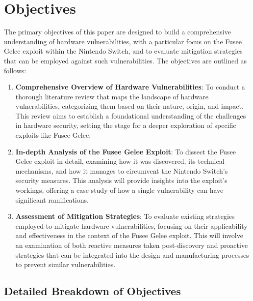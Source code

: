 \hypertarget{objectives}{%
\section{Objectives}\label{objectives}}

The primary objectives of this paper are designed to build a comprehensive understanding of hardware vulnerabilities, with a particular focus on the Fusee Gelee exploit within the Nintendo Switch, and to evaluate mitigation strategies that can be employed against such vulnerabilities. The objectives are outlined as follows:

\begin{enumerate}
\def\labelenumi{\arabic{enumi}.}
\item
  \textbf{Comprehensive Overview of Hardware Vulnerabilities}: To conduct a thorough literature review that maps the landscape of hardware vulnerabilities, categorizing them based on their nature, origin, and impact. This review aims to establish a foundational understanding of the challenges in hardware security, setting the stage for a deeper exploration of specific exploits like Fusee Gelee.
\item
  \textbf{In-depth Analysis of the Fusee Gelee Exploit}: To dissect the Fusee Gelee exploit in detail, examining how it was discovered, its technical mechanisms, and how it manages to circumvent the Nintendo Switch's security measures. This analysis will provide insights into the exploit's workings, offering a case study of how a single vulnerability can have significant ramifications.
\item
  \textbf{Assessment of Mitigation Strategies}: To evaluate existing strategies employed to mitigate hardware vulnerabilities, focusing on their applicability and effectiveness in the context of the Fusee Gelee exploit. This will involve an examination of both reactive measures taken post-discovery and proactive strategies that can be integrated into the design and manufacturing processes to prevent similar vulnerabilities.
\end{enumerate}

\hypertarget{detailed-breakdown-of-objectives}{%
\subsection{Detailed Breakdown of
Objectives}\label{detailed-breakdown-of-objectives}}

